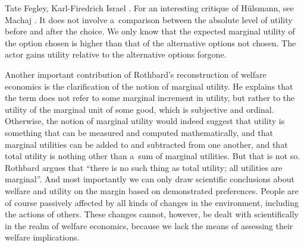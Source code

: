 \begin{artengenv2auth}{Tate Fegley, Karl-Firedrich Israel}
{%
\parencite[][]{hulsmann_facts_2003}. %
 For an interesting critique of Hülsmann, see Machaj 
\parencite*[][]{machaj_counterfactuals_2012}. %
 } It does not involve a~comparison between the absolute level of utility before and after the choice. We only know that the expected marginal utility of the option chosen is higher than that of the alternative options not chosen. The actor gains utility relative to the alternative options forgone.



Another important contribution of Rothbard's reconstruction of welfare economics is the clarification of the notion of marginal utility. He explains that the term does not refer to some marginal increment in utility, but rather to the utility of the marginal unit of some good, which is subjective and ordinal. Otherwise, the notion of marginal utility would indeed suggest that utility is something that can be measured and computed mathematically, and that marginal utilities can be added to and subtracted from one another, and that total utility is nothing other than a~sum of marginal utilities. But that is not so. Rothbard 
\parencite*[][p.301]{rothbard_toward_2011} %
 argues that ``there is no such thing as total utility; all utilities are marginal''. And most importantly we can only draw scientific conclusions about welfare and utility on the margin based on demonstrated preferences. People are of course passively affected by all kinds of changes in the environment, including the actions of others. These changes cannot, however, be dealt with scientifically in the realm of welfare economics, because we lack the means of assessing their welfare implications.




\end{artengenv2auth}

